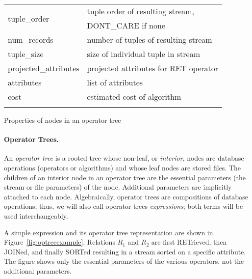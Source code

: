 \begin{centeredtable*}
\begin{minipage}[b]{6.5cm}
\begin{tabular}{|l|l|}
\multirow{2}{\first}{tuple\_order}
    & tuple order of resulting stream, \\
    & DONT\_CARE if none \\ \hline
num\_records
    & number of tuples of resulting stream \\ \hline
tuple\_size
    & size of individual tuple in stream \\ \hline
projected\_attributes
    & projected attributes for RET operator \\ \hline
attributes
    & list of attributes \\ \hline
cost
    & estimated cost of algorithm \\ \thickhline
\end{tabular}
\caption{Properties of nodes in an operator tree}
\label{tab:annotations}
\end{minipage}
\end{centeredtable*}

\paragraph{Operator Trees.}
An \emph{operator tree} is a rooted tree whose non-leaf, or
\emph{interior}, nodes are database operations (operators or
algorithms) and whose leaf nodes are stored files.  The children of an
interior node in an operator tree are the essential parameters (\ie the
stream or file parameters) of the node.  Additional parameters are
implicitly attached to each node.  Algebraically, operator trees are
compositions of database operations; thus, we will also call operator
trees \emph{expressions}; both terms will be used interchangeably.

\begin{example}
A simple expression and its operator tree representation are shown
in Figure~\ref{fig:optreeexample}.  Relations $R_1$ and $R_2$ are first 
RETrieved, then JOINed, and finally SORTed resulting in a stream
sorted on a specific attribute.  The figure shows only the essential
parameters of the various operators, not the additional parameters.
\end{example}

\begin{comment}
The figures which follow.

               SORT
                 |
                 |
               JOIN
                /\
               /  \
             RET  RET
              |    |
              |    |
             R1   R2

            Merge_sort
                |
                |
           Nested_loops
               / \
              /   \
        File_scan File_scan
            |         |
            |         |
           R1        R2

\end{comment}

